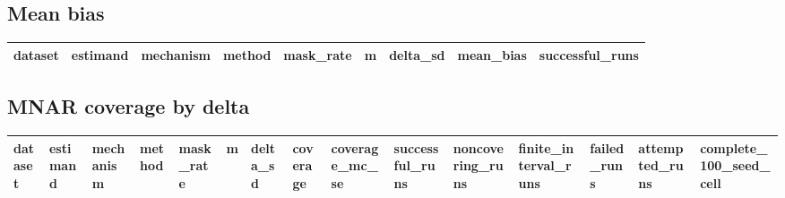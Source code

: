 \subsection*{Mean bias}

\begin{tabular}{lllllllll}
\hline
dataset & estimand & mechanism & method & mask\_rate & m & delta\_sd & mean\_bias & successful\_runs \\
\hline
\hline
\end{tabular}

\subsection*{MNAR coverage by delta}

\begin{tabular}{lllllllllllllll}
\hline
dataset & estimand & mechanism & method & mask\_rate & m & delta\_sd & coverage & coverage\_mc\_se & successful\_runs & noncovering\_runs & finite\_interval\_runs & failed\_runs & attempted\_runs & complete\_100\_seed\_cell \\
\hline
\hline
\end{tabular}

